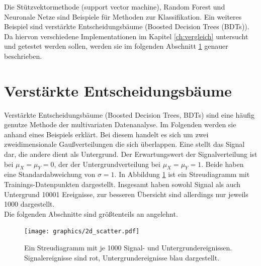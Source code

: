 Die St\"utzvektormethode (support vector machine), Random Forest und Neuronale Netze sind Beispiele f\"ur Methoden zur Klassifikation. 
Ein weiteres Beispiel sind verst\"arkte Entscheidungsb\"aume (Boosted Decision Trees (BDTs)). Da hiervon verschiedene Implementationen im Kapitel \ref{ch:vergleich} untersucht und getestet werden sollen, werden sie im folgenden Abschnitt \ref{ch:Algorithmen:sec:BDT} genauer beschrieben.

\section{Verst\"arkte Entscheidungsb\"aume}
\label{ch:Algorithmen:sec:BDT}

Verst\"arkte Entscheidungsb\"aume (Boosted Decision Trees, BDTs) sind eine h\"aufig genutze Methode der multivariaten Datenanalyse. Im Folgenden werden sie anhand eines Beispiels erkl\"art. Bei diesem handelt es sich um zwei zweidimensionale Gau\ss verteilungen die sich \"uberlappen. Eine stellt das Signal dar, die andere dient als Untergrund. Der Erwartungswert der Signalverteilung ist bei $\mu_X=\mu_Y=0$, der der Untergrundverteilung bei $\mu_X=\mu_Y=1$. Beide haben eine Standardabweichung von $\sigma=1$. In Abbildung \ref{fig:2dgauss_scat} ist ein Streudiagramm mit Trainings-Datenpunkten dargestellt. Insgesamt haben sowohl Signal als auch Untergrund 10001 Ereignisse, zur besseren \"Ubersicht sind allerdings nur jeweils 1000 dargestellt.\\
Die folgenden Abschnitte sind gr\"o\ss tenteils an \cite{SWB-307748006} angelehnt.

\begin{figure}[tbp]
 \begin{center}
   \texttt{[image: graphics/2d\_scatter.pdf]}
   \parbox[b]{12cm}{
     \caption[Streudiagramm mit Trainings-Datenpunkten]
             {\label{fig:2dgauss_scat}Ein Streudiagramm mit je 1000 Signal- und Untergrundereignissen. Signalereignisse sind rot, Untergrundereignisse blau dargestellt.}
   }
 \end{center}
\end{figure}

